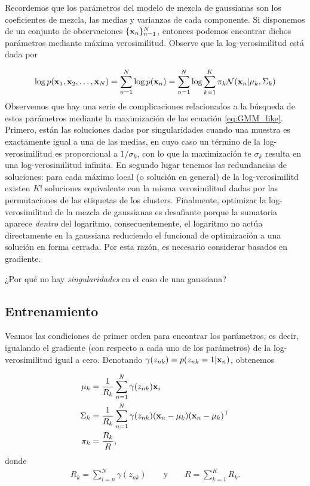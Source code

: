 Recordemos que los parámetros del modelo de mezcla de gaussianas son los coeficientes de mezcla, las medias y varianzas de cada componente. Si disponemos de un conjunto de observaciones $\{\mathbf{x}_n\}_{n=1}^N$, entonces podemos encontrar dichos parámetros mediante máxima verosimilitud. Observe que la log-verosimilitud está dada por 

\begin{equation}
	\log p(\mathbf{x}_1,\mathbf{x}_2,\ldots,\mathbf{x}_N) = \sum_{n=1}^N \log p(\mathbf{x}_n) = \sum_{n=1}^N \log \sum_{k=1}^K  \pi_k{\mathcal N}(\mathbf{x}_n|\mu_k,\Sigma_k) \label{eq:GMM_like}	
\end{equation}
Observemos que hay una serie de complicaciones relacionados a la búsqueda de estos parámetros mediante la maximización de las ecuación \eqref{eq:GMM_like}. Primero, están las soluciones dadas por singularidades cuando una muestra es exactamente igual a una de las medias, en cuyo caso un término de la log-verosimilitud es proporcional a $1/\sigma_k$, con lo que la maximización te $\sigma_k$ resulta en una log-verosimilitud infinita. En segundo lugar tenemos las redundancias de soluciones: para cada máximo local (o solución en general) de la log-verosimilitd existen $K!$ soluciones equivalente con la misma verosimilitud dadas por las permutaciones de las etiquetas de los clusters. Finalmente, optimizar la log-verosimilitud de la mezcla de gaussianas es desafiante porque la sumatoria aparece \emph{dentro} del logaritmo, consecuentemente,  el logaritmo no actúa directamente en la gaussiana reduciendo el funcional de optimización a una solución en forma cerrada. Por esta razón, es necesario considerar basados en gradiente.

\begin{mdframed}[style=pendiente, frametitle={\center discusión}]
¿Por qué no hay \emph{singularidades} en el caso de una gaussiana?
\end{mdframed}


\subsection{Entrenamiento} 
\label{sub:GMM_train}

Veamos las condiciones de primer orden para encontrar los parámetros, es decir, igualando el gradiente (con respecto a cada uno de los parámetros) de la log-verosimilitud igual a cero. Denotando $\gamma(z_{nk}) = p(z_{nk}=1|\mathbf{x}_n)$, obtenemos

 
    \begin{align}
    \mu_k & = \frac{1}{R_k}\sum_{n=1}^N \gamma(z_{nk})\mathbf{x}_i\\
    \Sigma_k & = \frac{1}{R_k} \sum_{n=1}^N \gamma(z_{nk})(\mathbf{x}_n - \mu_k)(\mathbf{x}_n - \mu_k)^\top\\
    \pi_k & = \frac{R_k}{R},
    \end{align}
    donde
    \begin{align*}
    R_k = \sum_{i=n}^N \gamma(z_{nk}) \qquad \text{y} \qquad R = \sum_{k=1}^K R_k.
    \end{align*}


